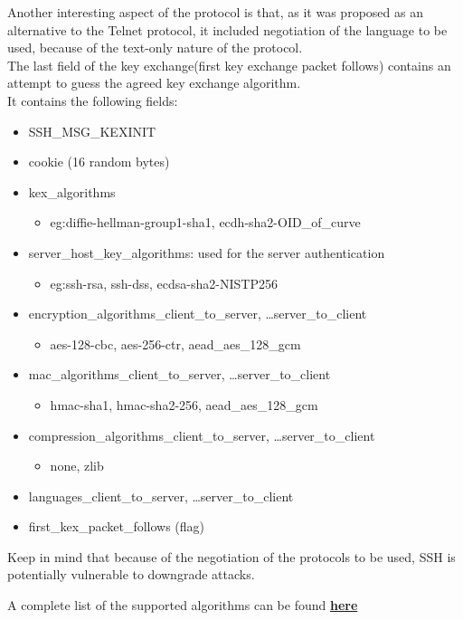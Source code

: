Another interesting aspect of the protocol is that, as it was proposed
as an alternative to the Telnet protocol, it included negotiation of
the language to be used, because of the text-only nature of the 
protocol.\\
The last field of the key exchange(first key exchange packet follows)
contains an attempt to guess the agreed key exchange algorithm.\\
It contains the following fields:
\begin{itemize}
    \item SSH\_MSG\_KEXINIT
    \item cookie (16 random bytes)
    \item kex\_algorithms
      \begin{itemize}
        \item eg:diffie-hellman-group1-sha1, ecdh-sha2-OID\_of\_curve
      \end{itemize}
    \item server\_host\_key\_algorithms: used for the server authentication
      \begin{itemize}
        \item eg:ssh-rsa, ssh-dss, ecdsa-sha2-NISTP256
      \end{itemize}
    \item encryption\_algorithms\_client\_to\_server, \dots server\_to\_client
      \begin{itemize}
        \item aes-128-cbc, aes-256-ctr, aead\_aes\_128\_gcm
      \end{itemize}
    \item mac\_algorithms\_client\_to\_server, \dots server\_to\_client
      \begin{itemize}
        \item hmac-sha1, hmac-sha2-256, aead\_aes\_128\_gcm
      \end{itemize}
    \item compression\_algorithms\_client\_to\_server, \dots server\_to\_client
      \begin{itemize}
        \item none, zlib
      \end{itemize}
    \item languages\_client\_to\_server, \dots server\_to\_client
    \item first\_kex\_packet\_follows (flag)
\end{itemize}
Keep in mind that because of the negotiation of the protocols to be
used, SSH is potentially vulnerable to downgrade attacks.
\begin{boxH}
  A complete list of the supported algorithms can be found
  \href{https://www.iana.org/assignments/ssh-parameters/ssh-parameters.xhtml}{\textbf{here}}
\end{boxH}

